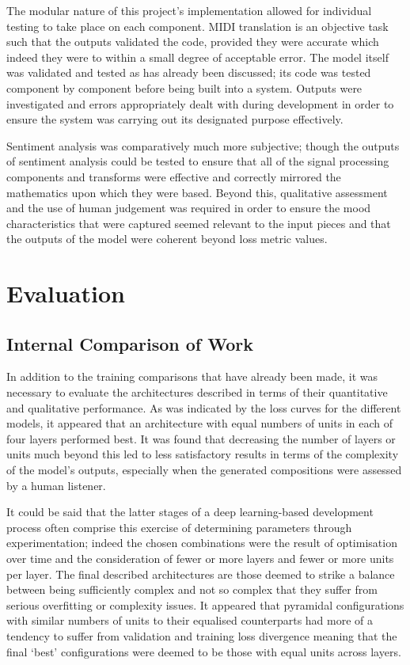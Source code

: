 \documentclass[12pt,]{article}
\begin{document}
The modular nature of this project's implementation allowed for
individual testing to take place on each component. MIDI translation is
an objective task such that the outputs validated the code, provided
they were accurate which indeed they were to within a small degree of
acceptable error. The model itself was validated and tested as has
already been discussed; its code was tested component by component
before being built into a system. Outputs were investigated and errors
appropriately dealt with during development in order to ensure the
system was carrying out its designated purpose effectively.

Sentiment analysis was comparatively much more subjective; though the
outputs of sentiment analysis could be tested to ensure that all of the
signal processing components and transforms were effective and correctly
mirrored the mathematics upon which they were based. Beyond this,
qualitative assessment and the use of human judgement was required in
order to ensure the mood characteristics that were captured seemed
relevant to the input pieces and that the outputs of the model were
coherent beyond loss metric values.

\hypertarget{evaluation}{%
\section{Evaluation}\label{evaluation}}

\hypertarget{internal-comparison-of-work}{%
\subsection{Internal Comparison of
Work}\label{internal-comparison-of-work}}

In addition to the training comparisons that have already been made, it
was necessary to evaluate the architectures described in terms of their
quantitative and qualitative performance. As was indicated by the loss
curves for the different models, it appeared that an architecture with
equal numbers of units in each of four layers performed best. It was
found that decreasing the number of layers or units much beyond this led
to less satisfactory results in terms of the complexity of the model's
outputs, especially when the generated compositions were assessed by a
human listener.

It could be said that the latter stages of a deep learning-based
development process often comprise this exercise of determining
parameters through experimentation; indeed the chosen combinations were
the result of optimisation over time and the consideration of fewer or
more layers and fewer or more units per layer. The final described
architectures are those deemed to strike a balance between being
sufficiently complex and not so complex that they suffer from serious
overfitting or complexity issues. It appeared that pyramidal
configurations with similar numbers of units to their equalised
counterparts had more of a tendency to suffer from validation and
training loss divergence meaning that the final `best' configurations
were deemed to be those with equal units across layers.
\end{document}
